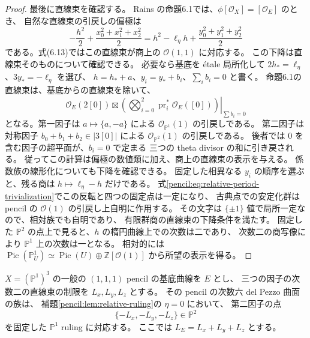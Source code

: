 \begin{proof}
最後に直線束を確認する。
Rains の命題6.1では、$\phi[\mathcal O_X]=[\mathcal O_E]$ のとき、
自然な直線束の引戻しの偏極は
\[
 -\frac{h^2}{2}+\frac{x_0^2+x_1^2+x_2^2}{2}
 =h^2-\ell_\eta h+\frac{y_0^2+y_1^2+y_2^2}{2}
\]
である。式(6.13)ではこの直線束が商上の $\mathcal O(1,1)$ に対応する。
この下降は直線束そのものについて確認できる。
必要なら基底を \'etale 局所化して
$2h_* =\ell_\eta$、$3y_*=-\ell_\eta$ を選び、
$h=h_*+a$、$y_i=y_*+b_i$、$\sum_i b_i=0$ と書く。
命題6.1の直線束は、基底からの直線束を除いて、
\[
 \mathcal O_E(2[0])\boxtimes
 \left.\left(\bigotimes_{i=0}^2\operatorname{pr}_i^*
                \mathcal O_E([0])\right)\right|_{\sum b_i=0}
\]
となる。第一因子は $a\mapsto\{a,-a\}$ による
$\mathcal O_{\mathbb P^1}(1)$ の引戻しである。
第二因子は対称因子 $b_0+b_1+b_2\in|3[0]|$ による
$\mathcal O_{\mathbb P^2}(1)$ の引戻しである。
後者では $0$ を含む因子の超平面が、$b_i=0$ で定まる
三つの theta divisor の和に引き戻される。
従ってこの計算は偏極の数値類に加え、商上の直線束の表示を与える。
係数族の線形化についても下降を確認できる。
固定した相異なる $y_i$ の順序を選ぶと、残る商は
$h\mapsto\ell_\eta-h$ だけである。
式\eqref{pencil:eq:relative-period-trivialization}でこの反転と四つの固定点は一定になり、
古典点での安定化群は pencil の $\mathcal O(1)$ の引戻し上自明に作用する。
その文字は $\{\pm1\}$ 値で局所一定なので、相対族でも自明であり、
有限群商の直線束の下降条件を満たす。
固定した $\mathbb P^2$ の点上で見ると、$h$ の楕円曲線上での次数は二であり、
次数二の商写像により $\mathbb P^1$ 上の次数は一となる。
相対的には $\operatorname{Pic}(\mathbb P^1_U)
\simeq\operatorname{Pic}(U)\oplus\mathbb Z[\mathcal O(1)]$ から所望の表示を得る。
\end{proof}

\begin{lemma}\label{pencil:lem:classical-ruling}
$X=(\mathbb P^1)^3$ の一般の $(1,1,1)$ pencil の基底曲線を $E$ とし、
三つの因子の次数二の直線束の制限を $L_x,L_y,L_z$ とする。
その pencil の次数六 del Pezzo 曲面の族は、
補題\ref{pencil:lem:relative-ruling}の $\eta=0$ において、
第二因子の点
\[
 \{-L_x,-L_y,-L_z\}\in\mathbb P^2
\]
を固定した $\mathbb P^1$ ruling に対応する。
ここでは $L_E=L_x+L_y+L_z$ とする。
\end{lemma}


